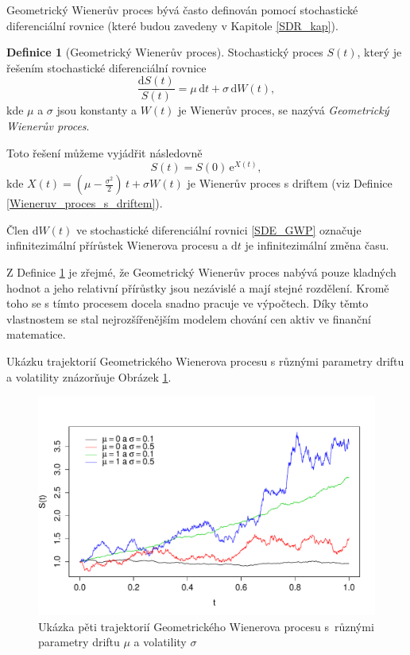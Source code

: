 \documentclass[a4paper,12pt]{report}
\theoremstyle{definition} \newtheorem{definice}[veta]{Definice}
\theoremstyle{remark}
\begin{document}
Geometrický Wienerův proces bývá často definován pomocí  stochastické diferenciální rovnice (které budou zavedeny v Kapitole \ref{SDR_kap}).
\begin{definice}[Geometrický Wienerův proces]\label{Geometricky_Wieneruv_proces}
Stochastický proces $S(t)$, který je řešením stochastické diferenciální rovnice 
\begin{equation}\label{SDE_GWP}
\frac{\mathrm{d} S(t)}{S(t)} = \mu\,\mathrm{d}t + \sigma\,\mathrm{d}W (t), 
\end{equation}
kde  $\mu$ a $\sigma$ jsou konstanty a $W (t)$ je Wienerův proces,
se nazývá \textit{Geometrický Wienerův proces}.

Toto řešení můžeme vyjádřit následovně
\begin{equation}\label{GWP}
S(t) = S(0)\,\mathrm{e}^{X(t)},
\end{equation}
kde $X(t) = (\mu - \frac{\sigma^2}{2})\,t + \sigma W (t)$ je Wienerův proces s driftem (viz Definice \ref{Wieneruv_proces_s_driftem}).
\end{definice}
Člen $\mathrm{d}W(t)$ ve stochastické diferenciální rovnici \eqref{SDE_GWP} označuje infinitezimální přírůstek Wienerova procesu a $\mathrm{d}t$ je infinitezimální změna času.

Z Definice \ref{Geometricky_Wieneruv_proces} je zřejmé, že Geometrický Wienerův proces nabývá pouze kladných hodnot a jeho relativní přírůstky jsou nezávislé a mají stejné rozdělení. 
Kromě toho se s tímto procesem docela snadno pracuje ve výpočtech. 
Díky těmto vlastnostem se stal nejrozšířenějším modelem chování cen aktiv ve finanční matematice.

Ukázku trajektorií Geometrického Wienerova procesu s různými parametry driftu a volatility znázorňuje Obrázek \ref{GP_graf}.

\begin{figure}[!htbp]
  \centering 
	\includegraphics[width=13.5cm, clip, trim= 0 15 25 50]{IMG/GP_v2.pdf}
  \caption{Ukázka pěti trajektorií Geometrického Wienerova procesu s~různými parametry driftu $\mu$ a volatility $\sigma$}  \label{GP_graf}
\end{figure}
\end{document}
